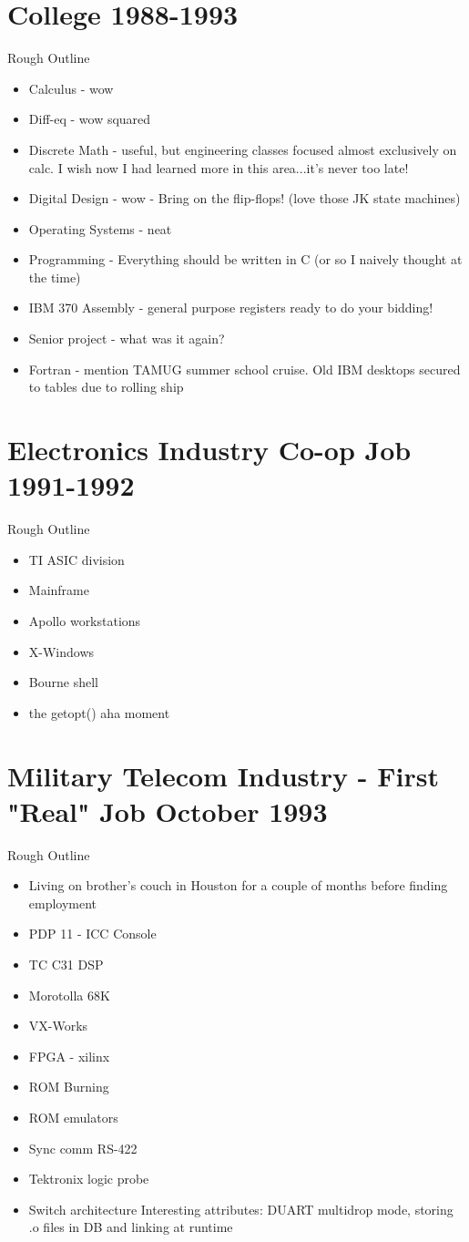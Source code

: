 \documentclass[12pt]{article}
\begin{document}
\section{College 1988-1993}
	Rough Outline
	\begin{itemize}
	\item Calculus - wow
	\item Diff-eq - wow squared
	\item Discrete Math - useful, but engineering classes focused almost exclusively on calc. I wish now I had 
	learned more in this area...it's never too late!
	\item Digital Design - wow - Bring on the flip-flops! (love those JK state machines)
	\item Operating Systems - neat
	\item Programming - Everything should be written in C (or so I naively thought at the time)
	\item IBM 370 Assembly - general purpose registers ready to do your bidding!
	\item Senior project - what was it again?
	\item Fortran - mention TAMUG summer school cruise. Old IBM desktops secured to tables due to rolling ship
	\end{itemize}

\section{Electronics Industry Co-op Job 1991-1992}
	Rough Outline
	\begin{itemize}
	\item TI ASIC division
	\item Mainframe
	\item Apollo workstations
	\item X-Windows
	\item Bourne shell
	\item the getopt() aha moment
	\end{itemize}
	
\section{Military Telecom Industry - First "Real" Job October 1993}
	Rough Outline
	\begin{itemize}
	\item Living on brother's couch in Houston for a couple of months before finding employment
	\item PDP 11 - ICC Console
	\item TC C31 DSP
	\item Morotolla 68K
	\item VX-Works
	\item FPGA - xilinx
	\item ROM Burning
	\item ROM emulators
	\item Sync comm RS-422
	\item Tektronix logic probe
	\item Switch architecture Interesting attributes: DUART multidrop mode, storing .o files in DB and linking at runtime
	\end{itemize}
\end{document}
